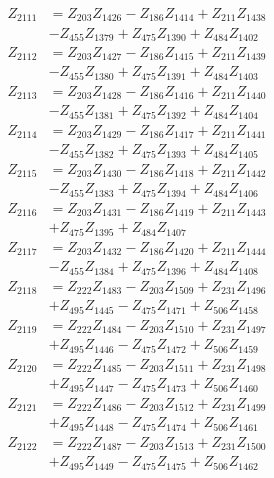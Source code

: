 \begin{multicols}{2}
\begin{align}
Z_{2111} &= Z_{203}Z_{1426} - Z_{186}Z_{1414} + Z_{211}Z_{1438}  \nonumber \\
&- Z_{455}Z_{1379} + Z_{475}Z_{1390} + Z_{484}Z_{1402} \nonumber \\
Z_{2112} &= Z_{203}Z_{1427} - Z_{186}Z_{1415} + Z_{211}Z_{1439}  \nonumber \\
&- Z_{455}Z_{1380} + Z_{475}Z_{1391} + Z_{484}Z_{1403} \nonumber \\
Z_{2113} &= Z_{203}Z_{1428} - Z_{186}Z_{1416} + Z_{211}Z_{1440}  \nonumber \\
&- Z_{455}Z_{1381} + Z_{475}Z_{1392} + Z_{484}Z_{1404} \nonumber \\
Z_{2114} &= Z_{203}Z_{1429} - Z_{186}Z_{1417} + Z_{211}Z_{1441}  \nonumber \\
&- Z_{455}Z_{1382} + Z_{475}Z_{1393} + Z_{484}Z_{1405} \nonumber \\
Z_{2115} &= Z_{203}Z_{1430} - Z_{186}Z_{1418} + Z_{211}Z_{1442}  \nonumber \\
&- Z_{455}Z_{1383} + Z_{475}Z_{1394} + Z_{484}Z_{1406} \nonumber \\
Z_{2116} &= Z_{203}Z_{1431} - Z_{186}Z_{1419} + Z_{211}Z_{1443}  \nonumber \\
&+ Z_{475}Z_{1395} + Z_{484}Z_{1407} \nonumber \\
Z_{2117} &= Z_{203}Z_{1432} - Z_{186}Z_{1420} + Z_{211}Z_{1444}  \nonumber \\
&- Z_{455}Z_{1384} + Z_{475}Z_{1396} + Z_{484}Z_{1408} \nonumber \\
Z_{2118} &= Z_{222}Z_{1483} - Z_{203}Z_{1509} + Z_{231}Z_{1496}  \nonumber \\
&+ Z_{495}Z_{1445} - Z_{475}Z_{1471} + Z_{506}Z_{1458} \nonumber \\
Z_{2119} &= Z_{222}Z_{1484} - Z_{203}Z_{1510} + Z_{231}Z_{1497}  \nonumber \\
&+ Z_{495}Z_{1446} - Z_{475}Z_{1472} + Z_{506}Z_{1459} \nonumber \\
Z_{2120} &= Z_{222}Z_{1485} - Z_{203}Z_{1511} + Z_{231}Z_{1498}  \nonumber \\
&+ Z_{495}Z_{1447} - Z_{475}Z_{1473} + Z_{506}Z_{1460} \nonumber \\
Z_{2121} &= Z_{222}Z_{1486} - Z_{203}Z_{1512} + Z_{231}Z_{1499}  \nonumber \\
&+ Z_{495}Z_{1448} - Z_{475}Z_{1474} + Z_{506}Z_{1461} \nonumber \\
Z_{2122} &= Z_{222}Z_{1487} - Z_{203}Z_{1513} + Z_{231}Z_{1500}  \nonumber \\
&+ Z_{495}Z_{1449} - Z_{475}Z_{1475} + Z_{506}Z_{1462} \nonumber \\

\end{align}
\end{multicols}
